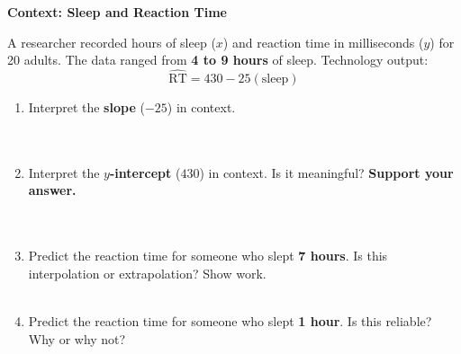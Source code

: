 \documentclass[10pt]{article}
\begin{document}
\vspace{0.12in}

\begin{tcolorbox}[colback=white, colframe=black!40, boxrule=0.8pt, arc=2mm,
    left=4mm, right=4mm, top=3mm, bottom=3mm,
    title={\textbf{Tier A --- Approaching Proficiency}}, fonttitle=\bfseries, halign title=center]
\small

\textbf{Context: Sleep and Reaction Time}

A researcher recorded hours of sleep ($x$) and reaction time in milliseconds ($y$) for
20 adults. The data ranged from \textbf{4 to 9 hours} of sleep. Technology output:
\[
  \widehat{\text{RT}} = 430 - 25(\text{sleep})
\]

\vspace{8pt}

\begin{enumerate}[leftmargin=1.6em, itemsep=0.18in]

  \item Interpret the \textbf{slope} ($-25$) in context.\\[8pt]
        \writeline\\[3pt]\writeline\\[3pt]\writeline

  \item Interpret the \textbf{$y$-intercept} ($430$) in context.
        Is it meaningful? \textbf{Support your answer.}\\[8pt]
        \writeline\\[3pt]\writeline\\[3pt]\writeline

  \item Predict the reaction time for someone who slept \textbf{7 hours}.
        Is this interpolation or extrapolation? Show work.\\[8pt]
        \writeline\\[3pt]\writeline

  \item Predict the reaction time for someone who slept \textbf{1 hour}.
        Is this reliable? Why or why not?\\[8pt]
        \writeline\\[3pt]\writeline

\end{enumerate}
\end{tcolorbox}

\vspace{0.12in}
\end{document}
